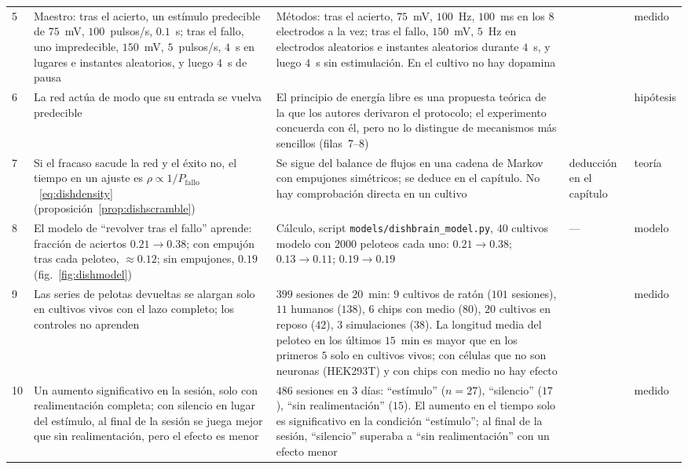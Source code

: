 {\begin{longtable}{>{\raggedright}p{0.5cm}>{\raggedright}p{4.0cm}>{\raggedright}p{5.6cm}>{\raggedright}p{2.3cm}>{\raggedright\arraybackslash}p{1.7cm}}
5 & Maestro: tras el acierto, un estímulo predecible de $75$~mV, $100$~pulsos/s, $0.1$~s; tras el fallo, uno impredecible, $150$~mV, $5$~pulsos/s, $4$~s en lugares e instantes aleatorios, y luego $4$~s de pausa & Métodos: tras el acierto, $75$~mV, $100$~Hz, $100$~ms en los $8$ electrodos a la vez; tras el fallo, $150$~mV, $5$~Hz en electrodos aleatorios e instantes aleatorios durante $4$~s, y luego $4$~s sin estimulación. En el cultivo no hay dopamina & \cite{Kagan2022} & medido \\
6 & La red actúa de modo que su entrada se vuelva predecible & El principio de energía libre es una propuesta teórica de la que los autores derivaron el protocolo; el experimento concuerda con él, pero no lo distingue de mecanismos más sencillos (filas~7--8) & \cite{Friston2010,Kagan2022} & hipótesis \\
7 & Si el fracaso sacude la red y el éxito no, el tiempo en un ajuste es $\rho\propto1/P_{\text{fallo}}$~\eqref{eq:dishdensity} (proposición~\ref{prop:dishscramble}) & Se sigue del balance de flujos en una cadena de Markov con empujones simétricos; se deduce en el capítulo. No hay comprobación directa en un cultivo & deducción en el capítulo & teoría \\
8 & El modelo de “revolver tras el fallo” aprende: fracción de aciertos $0.21\to0.38$; con empujón tras cada peloteo, $\approx0.12$; sin empujones, $0.19$ (fig.~\ref{fig:dishmodel}) & Cálculo, script \texttt{models/dishbrain\_model.py}, $40$ cultivos modelo con $2000$ peloteos cada uno: $0.21\to0.38$; $0.13\to0.11$; $0.19\to0.19$ & --- & modelo \\
9 & Las series de pelotas devueltas se alargan solo en cultivos vivos con el lazo completo; los controles no aprenden & $399$ sesiones de $20$~min: $9$ cultivos de ratón ($101$ sesiones), $11$ humanos ($138$), $6$ chips con medio ($80$), $20$ cultivos en reposo ($42$), $3$ simulaciones ($38$). La longitud media del peloteo en los últimos $15$~min es mayor que en los primeros $5$ solo en cultivos vivos; con células que no son neuronas (HEK293T) y con chips con medio no hay efecto & \cite{Kagan2022} & medido \\
10 & Un aumento significativo en la sesión, solo con realimentación completa; con silencio en lugar del estímulo, al final de la sesión se juega mejor que sin realimentación, pero el efecto es menor & $486$ sesiones en $3$ días: “estímulo” ($n=27$), “silencio” ($17$), “sin realimentación” ($15$). El aumento en el tiempo solo es significativo en la condición “estímulo”; al final de la sesión, “silencio” superaba a “sin realimentación” con un efecto menor & \cite{Kagan2022} & medido \\

\end{longtable}}
